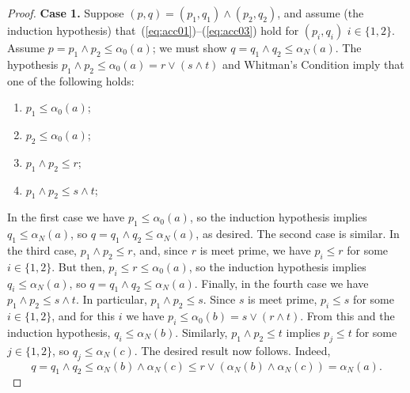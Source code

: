 \begin{proof}
    
    \medskip
    \noindent \textbf{Case 1.}
    Suppose $(p,q) = (p_1, q_1) \wedge (p_2, q_2)$, and assume (the induction hypothesis) 
    that~(\ref{eq:acc01})--(\ref{eq:acc03}) hold for
    $(p_i,q_i)$ $i\in \{1,2\}$.
    Assume $p = p_1\wedge p_2 \leq \alpha_0(a)$; we must show 
    $q=q_1\wedge q_2 \leq \alpha_N(a)$.
    The hypothesis $p_1\wedge p_2 \leq \alpha_0(a) = r\vee (s \wedge t)$ and
    Whitman's Condition imply that one of the following holds:
    \begin{enumerate}
      \item   $p_1\leq \alpha_0(a)$;  
      \item   $p_2\leq \alpha_0(a)$;  
      \item   $p_1\wedge p_2\leq r$;  
      \item   $p_1\wedge p_2 \leq s \wedge t$;  
    \end{enumerate}
    In the first case we have $p_1\leq \alpha_0(a)$, so
    the induction hypothesis implies $q_1\leq \alpha_N(a)$, so 
    $q = q_1\wedge q_2\leq \alpha_N(a)$, as desired.  
    The second case is similar.
    In the third case, $p_1 \wedge p_2 \leq r$, and, since $r$ is meet prime, we have
    $p_i\leq r$ for some $i\in \{1,2\}$.  
    But then, $p_i \leq r \leq \alpha_0(a)$, so 
    the induction hypothesis implies $q_i \leq \alpha_N(a)$, so 
    $q = q_1\wedge q_2\leq \alpha_N(a)$.
    Finally, in the fourth case we have $p_1\wedge p_2 \leq s \wedge t$. 
    In particular, $p_1\wedge p_2 \leq s$. Since $s$ is meet prime,
    $p_i\leq s$ for some $i\in \{1,2\}$,  
    and for this $i$ we have $p_i \leq \alpha_0(b) = s\vee (r\wedge t)$.
    From this and the induction hypothesis, $q_i \leq \alpha_N(b)$.
    Similarly, $p_1\wedge p_2 \leq t$ implies 
    $p_j\leq t$ for some $j\in \{1,2\}$, so $q_j \leq \alpha_N(c)$.
    The desired result now follows. Indeed,
    \[
    q = q_1\wedge q_2 \leq \alpha_N(b) \wedge \alpha_N(c) 
    \leq r \vee (\alpha_N(b)\wedge \alpha_N(c)) = \alpha_N(a).
    \] 
  

\end{proof}
